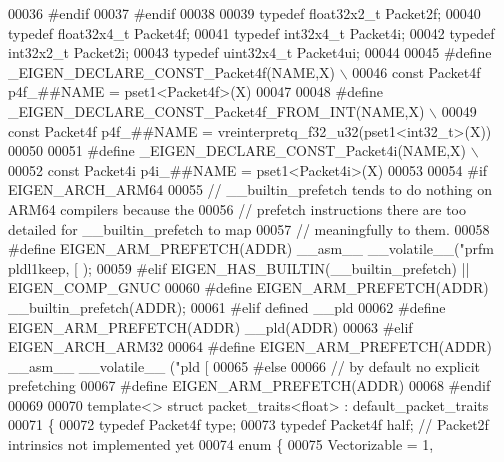 \begin{DoxyCode}
00036 \textcolor{preprocessor}{#endif}
00037 \textcolor{preprocessor}{#endif}
00038 
00039 \textcolor{keyword}{typedef} float32x2\_t Packet2f;
00040 \textcolor{keyword}{typedef} float32x4\_t Packet4f;
00041 \textcolor{keyword}{typedef} int32x4\_t   Packet4i;
00042 \textcolor{keyword}{typedef} int32x2\_t   Packet2i;
00043 \textcolor{keyword}{typedef} uint32x4\_t  Packet4ui;
00044 
00045 \textcolor{preprocessor}{#define \_EIGEN\_DECLARE\_CONST\_Packet4f(NAME,X) \(\backslash\)}
00046 \textcolor{preprocessor}{  const Packet4f p4f\_##NAME = pset1<Packet4f>(X)}
00047 
00048 \textcolor{preprocessor}{#define \_EIGEN\_DECLARE\_CONST\_Packet4f\_FROM\_INT(NAME,X) \(\backslash\)}
00049 \textcolor{preprocessor}{  const Packet4f p4f\_##NAME = vreinterpretq\_f32\_u32(pset1<int32\_t>(X))}
00050 
00051 \textcolor{preprocessor}{#define \_EIGEN\_DECLARE\_CONST\_Packet4i(NAME,X) \(\backslash\)}
00052 \textcolor{preprocessor}{  const Packet4i p4i\_##NAME = pset1<Packet4i>(X)}
00053 
00054 \textcolor{preprocessor}{#if EIGEN\_ARCH\_ARM64}
00055   \textcolor{comment}{// \_\_builtin\_prefetch tends to do nothing on ARM64 compilers because the}
00056   \textcolor{comment}{// prefetch instructions there are too detailed for \_\_builtin\_prefetch to map}
00057   \textcolor{comment}{// meaningfully to them.}
00058 \textcolor{preprocessor}{  #define EIGEN\_ARM\_PREFETCH(ADDR)  \_\_asm\_\_ \_\_volatile\_\_("prfm pldl1keep, [%
       );}
00059 \textcolor{preprocessor}{#elif EIGEN\_HAS\_BUILTIN(\_\_builtin\_prefetch) || EIGEN\_COMP\_GNUC}
00060 \textcolor{preprocessor}{  #define EIGEN\_ARM\_PREFETCH(ADDR) \_\_builtin\_prefetch(ADDR);}
00061 \textcolor{preprocessor}{#elif defined \_\_pld}
00062 \textcolor{preprocessor}{  #define EIGEN\_ARM\_PREFETCH(ADDR) \_\_pld(ADDR)}
00063 \textcolor{preprocessor}{#elif EIGEN\_ARCH\_ARM32}
00064 \textcolor{preprocessor}{  #define EIGEN\_ARM\_PREFETCH(ADDR) \_\_asm\_\_ \_\_volatile\_\_ ("pld [%
00065 \textcolor{preprocessor}{#else}
00066   \textcolor{comment}{// by default no explicit prefetching}
00067 \textcolor{preprocessor}{  #define EIGEN\_ARM\_PREFETCH(ADDR)}
00068 \textcolor{preprocessor}{#endif}
00069 
00070 \textcolor{keyword}{template}<> \textcolor{keyword}{struct }packet\_traits<float>  : default\_packet\_traits
00071 \{
00072   \textcolor{keyword}{typedef} Packet4f type;
00073   \textcolor{keyword}{typedef} Packet4f half; \textcolor{comment}{// Packet2f intrinsics not implemented yet}
00074   \textcolor{keyword}{enum} \{
00075     Vectorizable = 1,
}
\end{DoxyCode}
